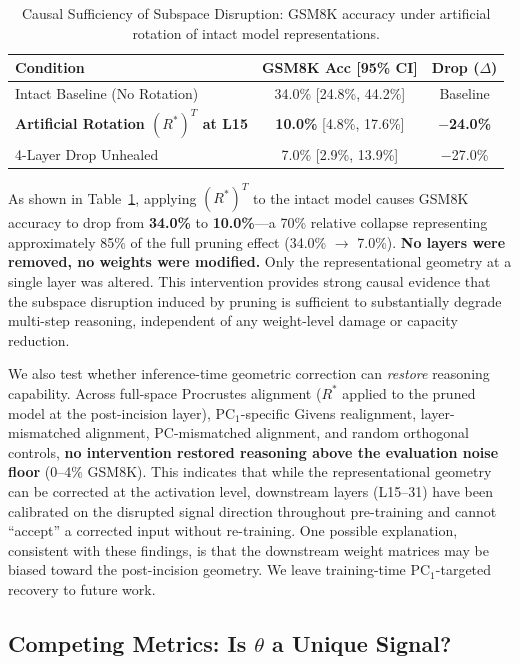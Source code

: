 \documentclass[11pt]{article}
\begin{document}
\begin{table}[t!]
\centering
\footnotesize
\setlength{\tabcolsep}{3pt}
\caption{Causal Sufficiency of Subspace Disruption: GSM8K accuracy under artificial rotation of intact model representations.}
\label{tab:sufficiency}
\begin{tabular}{lcc}
\toprule
\textbf{Condition} & \textbf{GSM8K Acc [95\% CI]} & \textbf{Drop ($\Delta$)} \\
\midrule
Intact Baseline (No Rotation) & 34.0\% [24.8\%, 44.2\%] & Baseline \\
\textbf{Artificial Rotation $(R^*)^T$ at L15} & \textbf{10.0\%} [4.8\%, 17.6\%] & \textbf{$-$24.0\%} \\
4-Layer Drop Unhealed & 7.0\% [2.9\%, 13.9\%] & $-$27.0\% \\
\bottomrule
\end{tabular}
\end{table}

As shown in Table~\ref{tab:sufficiency}, applying $(R^*)^T$ to the intact model causes GSM8K accuracy to drop from \textbf{34.0\%} to \textbf{10.0\%}---a 70\% relative collapse representing approximately 85\% of the full pruning effect (34.0\% $\!\to\!$ 7.0\%). \textbf{No layers were removed, no weights were modified.} Only the representational geometry at a single layer was altered. This intervention provides strong causal evidence that the subspace disruption induced by pruning is sufficient to substantially degrade multi-step reasoning, independent of any weight-level damage or capacity reduction.

We also test whether inference-time geometric correction can \textit{restore} reasoning capability. Across full-space Procrustes alignment ($R^*$ applied to the pruned model at the post-incision layer), PC$_1$-specific Givens realignment, layer-mismatched alignment, PC-mismatched alignment, and random orthogonal controls, \textbf{no intervention restored reasoning above the evaluation noise floor} (0--4\% GSM8K). This indicates that while the representational geometry can be corrected at the activation level, downstream layers (L15--31) have been calibrated on the disrupted signal direction throughout pre-training and cannot ``accept'' a corrected input without re-training. One possible explanation, consistent with these findings, is that the downstream weight matrices may be biased toward the post-incision geometry. We leave training-time PC$_1$-targeted recovery to future work.

\subsection{Competing Metrics: Is \texorpdfstring{$\theta$}{theta} a Unique Signal?}
\end{document}
